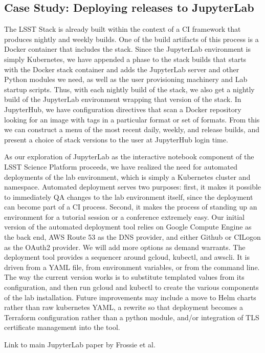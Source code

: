 \subsection{Case Study: Deploying releases to JupyterLab}

The LSST Stack is already built within the context of a CI framework
that produces nightly and weekly builds.  One of the build artifacts of
this process is a Docker container that includes the stack.  Since the
JupyterLab environment is simply Kubernetes, we have appended a phase to
the stack builds that starts with the Docker stack container and adds
the JupyterLab server and other Python modules we need, as well as the
user provisioning machinery and Lab startup scripts.  Thus, with each
nightly build of the stack, we also get a nightly build of the
JupyterLab environment wrapping that version of the stack.  In
JupyterHub, we have configuration directives that scan a Docker
repository looking for an image with tags in a particular format or set
of formats.  From this we can construct a menu of the most recent daily,
weekly, and release builds, and present a choice of stack versions to
the user at JupyterHub login time.

As our exploration of JupyterLab as the interactive notebook component
of the LSST Science Platform proceeds, we have realized the need for
automated deployments of the lab environment, which is simply a
Kubernetes cluster and namespace.  Automated deployment serves two
purposes: first, it makes it possible to immediately QA changes to the
lab environment itself, since the deployment can become part of a CI
process.  Second, it makes the process of standing up an environment for
a tutorial session or a conference extremely easy.  Our initial version
of the automated deployment tool relies on Google Compute Engine as the
back end, AWS Route 53 as the DNS provider, and either Github or CILogon
as the OAuth2 provider.  We will add more options as demand warrants.
The deployment tool provides a sequencer around gcloud, kubectl, and
awscli.  It is driven from a YAML file, from environment variables, or
from the command line.  The way the current version works is to
substitute templated values from its configuration, and then run gcloud
and kubectl to create the various components of the lab installation.
Future improvements may include a move to Helm charts rather than raw
kubernetes YAML, a rewrite so that deployment becomes a Terraform
configuration rather than a python module, and/or integration of TLS
certificate management into the tool.

Link to main JupyterLab paper by Frossie et al.
